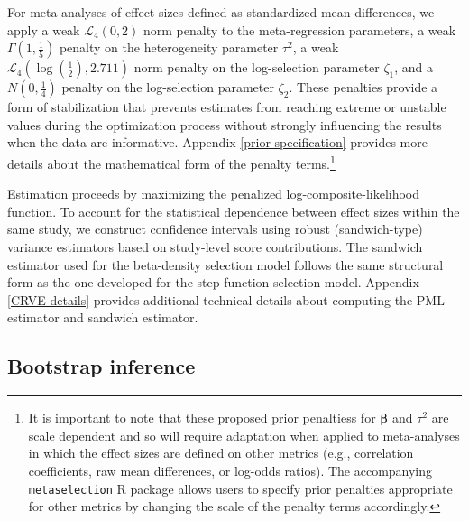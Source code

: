 \documentclass[
  american,
  man, donotrepeattitle,floatsintext]{apa7}
\begin{document}
For meta-analyses of effect sizes defined as standardized mean differences, we apply a weak \(\mathcal{L}_4(0,2)\) norm penalty to the meta-regression parameters, a weak \(\Gamma(1, \frac{1}{5})\) penalty on the heterogeneity parameter \(\tau^2\), a weak \(\mathcal{L}_4\left(
\log\left(\frac{1}{2}\right), 2.711\right)\) norm penalty on the log-selection parameter \(\zeta_1\), and a \(N\left(0,\frac{1}{4}\right)\) penalty on the log-selection parameter \(\zeta_2\).
These penalties provide a form of stabilization that prevents estimates from reaching extreme or unstable values during the optimization process without strongly influencing the results when the data are informative.
Appendix \ref{prior-specification} provides more details about the mathematical form of the penalty terms.\footnote{It is important to note that these proposed prior penaltiess for \(\boldsymbol\beta\) and \(\tau^2\) are scale dependent and so will require adaptation when applied to meta-analyses in which the effect sizes are defined on other metrics (e.g., correlation coefficients, raw mean differences, or log-odds ratios). The accompanying \texttt{metaselection} R package allows users to specify prior penalties appropriate for other metrics by changing the scale of the penalty terms accordingly.}

Estimation proceeds by maximizing the penalized log-composite-likelihood function.
To account for the statistical dependence between effect sizes within the same study, we construct confidence intervals using robust (sandwich-type) variance estimators based on study-level score contributions.
The sandwich estimator used for the beta-density selection model follows the same structural form as the one developed for the step-function selection model. Appendix \ref{CRVE-details} provides additional technical details about computing the PML estimator and sandwich estimator.

\subsection{Bootstrap inference}\label{bootstrap-inference}
\end{document}
